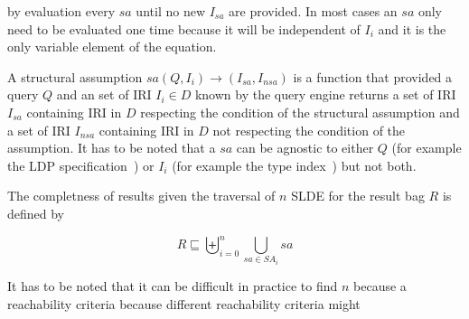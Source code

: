 by evaluation every $sa$ until no new $I_{sa}$ are provided. 
In most cases an $sa$ only need to be evaluated one time because it will be independent of $I_i$ and it is the only variable element of the equation.



\begin{definition}\label{def:structuralAssumption}
   A structural assumption $sa(Q, I_{i}) \rightarrow (I_{sa}, I_{nsa})$ is a function that provided a query $Q$ and an set of IRI $I_{i} \in D$ known by the query engine 
   returns a set of IRI $I_{sa}$ containing IRI in $D$ respecting the condition of the structural assumption and a set of IRI $I_{nsa}$ containing IRI in $D$ not respecting
   the condition of the assumption.
   It has to be noted that a $sa$ can be agnostic to either $Q$ (for example the LDP specification~\cite{Taelman2023}) or $I_i$ (for example the type index~\cite{Taelman2023}) but not both.  
\end{definition}



The completness of results given the traversal of $n$ SLDE for the result bag $R$ is defined by 

\begin{equation}
   R   \sqsubseteq  \biguplus_{i=0}^{n} \bigcup_{sa \in SA_i} sa 
\end{equation}

It has to be noted that it can be difficult in practice to find $n$ because a reachability criteria because different reachability criteria might 


\iffalse
While BQPs are syntactic objects, we shall use them as a represen-
tation of Linked Data queries which have a certain semantics. In the
remainder of this section we define this semantics. Due to the open-
ness and distributed nature of Webs such as the WWW we cannot
guarantee query results that are complete w.r.t. all Linked Data on
a Web. Nonetheless, we aim to provide a well-defined semantics.
Consequently, we have to limit our understanding of completeness.
However, instead of restricting ourselves to data from a fixed set
of sources selected or discovered beforehand, we introduce an ap-
proach that allows a query to make use of previously unknown data
and sources. Our definition of query semantics is based on a two-
phase approach: First, we define the part of a Web of Linked Data
that is reached by traversing links using the identifiers in a query
as a starting point. Then, we formalize the result of such a query
as the set of all valuations that map the query to a subset of all
data in the reachable part of the Web. Notice, while this two-phase
approach provides for a straightforward definition of the query se-
mantics in our model, it does not correspond to the actual query
execution strategy of integrating the traversal of data links into the
query execution process as illustrated in Section 2.
\fi



